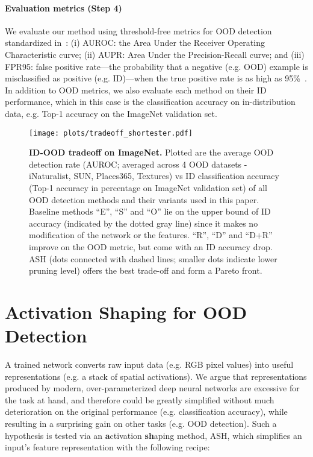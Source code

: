 \documentclass{article}
\newcommand{\figlabel}[1]{\label{fig:#1}}
\newcommand{\seclabel}[1]{\label{sec:#1}}
\newcommand{\ac}{ASH\xspace}
\begin{document}
\paragraph{Evaluation metrics (Step 4)}
We evaluate our method using threshold-free metrics for OOD detection standardized in~\citet{hendrycks17baseline}: (i) AUROC: the Area Under the Receiver Operating Characteristic curve; (ii) AUPR: Area Under the Precision-Recall curve; and (iii) FPR95: false positive rate---the probability that a negative (e.g. OOD) example is misclassified as positive (e.g. ID)---when the true positive rate is as high as 95\%~\citep{Liang2017}. 
In addition to OOD metrics, we also evaluate each method on their ID performance, which in this case is the classification accuracy on in-distribution data, e.g. Top-1 accuracy on the ImageNet validation set. 



\begin{figure}[hbt!]
    \centering 
	\texttt{[image: plots/tradeoff\_shortester.pdf]}
	\caption{\textbf{ID-OOD tradeoff on ImageNet.} Plotted are the average OOD detection rate (AUROC; averaged across 4 OOD datasets - iNaturalist, SUN, Places365, Textures) vs ID classification accuracy (Top-1 accuracy in percentage on ImageNet validation set) of all OOD detection methods and their variants used in this paper. Baseline methods ``E'', ``S'' and ``O'' lie on the upper bound of ID accuracy (indicated by the dotted gray line) since it makes no modification of the network or the features. ``R'', ``D'' and ``D+R'' improve on the OOD metric, but come with an ID accuracy drop. ASH (dots connected with dashed lines; smaller dots indicate lower pruning level) offers the best trade-off and form a Pareto front.}
	\figlabel{tradeoff}
\end{figure}


\section{Activation Shaping for OOD Detection}
\seclabel{method}

A trained network converts raw input data (e.g. RGB pixel values) into useful representations (e.g. a stack of spatial activations). We argue that representations produced by modern, over-parameterized deep neural networks are excessive for the task at hand, and therefore could be greatly simplified without much deterioration on the original performance (e.g. classification accuracy), while resulting in a surprising gain on other tasks (e.g. OOD detection).
Such a hypothesis is tested via an \textbf{a}ctivation \textbf{sh}aping method, \ac, which simplifies an input's feature representation with the following recipe:
\end{document}
